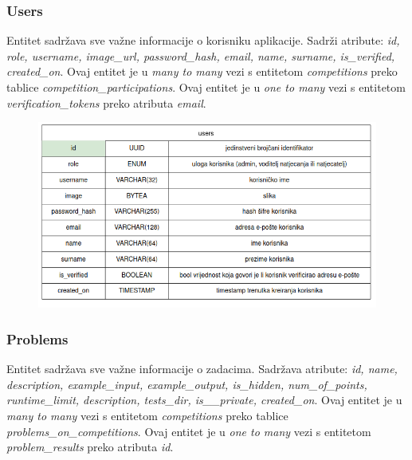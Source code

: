 				
				\subsubsection*{Users}
				
				Entitet  sadržava sve važne informacije o korisniku aplikacije. Sadrži atribute: \textit{id, role, username, image_url, password_hash, email, name, surname, is\_verified, created\_on}. Ovaj entitet je u \textit{many to many} vezi s entitetom \textit{competitions} preko tablice \textit{competition\_participations}. Ovaj entitet je u \textit{one to many} vezi s entitetom \textit{verification\_tokens} preko atributa \textit{email}. 
				\vspace{20mm}

				\begin{figure}[htbp]
					\centering
					\includegraphics[width=\linewidth]{slike/users_tablica.png}
				\end{figure}

				\vspace{30mm}

				\subsubsection*{Problems}

				Entitet  sadržava sve važne informacije o zadacima. Sadržava atribute: \textit{id, name, description, example\_input, example\_output, is\_hidden, num\_of\_points, runtime\_limit, description, tests\_dir, is_\_private, created\_on}. Ovaj entitet je u \textit{many to many} vezi s entitetom \textit{competitions} preko tablice \textit{problems\_on\_competitions}. Ovaj entitet je u \textit{one to many} vezi s entitetom \textit{problem\_results} preko atributa \textit{id}.

				\vspace{20mm}

